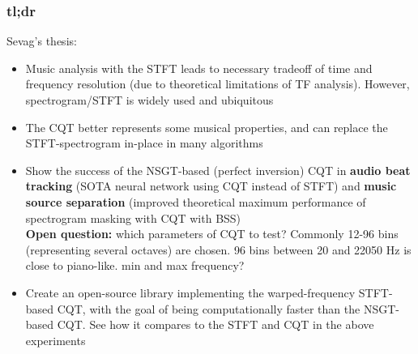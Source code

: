 \documentclass[usenames,dvipsnames]{beamer}
\begin{document}
\begin{frame}
	\frametitle{tl;dr}
	Sevag's thesis:
	\begin{itemize}
		\item
			Music analysis with the STFT leads to necessary tradeoff of time and frequency resolution (due to theoretical limitations of TF analysis). However, spectrogram/STFT is widely used and ubiquitous
		\item
			The CQT better represents some musical properties, and can replace the STFT-spectrogram in-place in many algorithms
		\item
			Show the success of the NSGT-based (perfect inversion) CQT in \textbf{audio beat tracking} (SOTA neural network using CQT instead of STFT) and \textbf{music source separation} (improved theoretical maximum performance of spectrogram masking with CQT with BSS)\\
			\textbf{Open question:} which parameters of CQT to test? Commonly 12-96 bins (representing several octaves) are chosen. 96 bins between 20 and 22050 Hz is close to piano-like. min and max frequency?
		\item
			Create an open-source library implementing the warped-frequency STFT-based CQT, with the goal of being computationally faster than the NSGT-based CQT. See how it compares to the STFT and CQT in the above experiments
	\end{itemize}
\end{frame}
\end{document}
